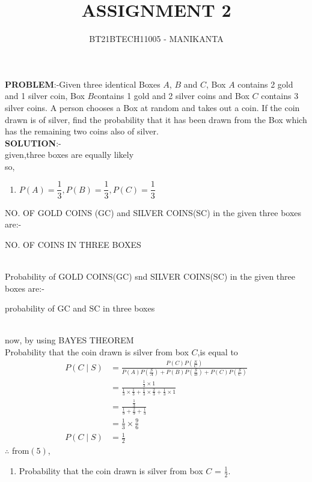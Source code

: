 \documentclass[journal,12pt,twocolumn]{IEEEtran}
\begin{document}
\vspace{3cm}
\title{ASSIGNMENT 2}
\author{BT21BTECH11005 - MANIKANTA}

\maketitle
\textbf{PROBLEM}:-Given three identical Boxes $A$, $B$ and $C$, Box $A$ contains 2 gold and 1 silver coin, Box $B $contains 1 gold and 2 silver coins and Box $C$ contains 3 silver coins. A person chooses a Box at random and takes out a coin. If the coin drawn is of silver, find the probability that it has been drawn from the Box which has the remaining two coins also of silver.\\

\textbf{SOLUTION}:-\\
given,three boxes are equally likely\\
so,\\
\begin{enumerate}[label=]
\item $\displaystyle P(A)= \dfrac{1}{3},\displaystyle P(B)= \dfrac{1}{3},\displaystyle P(C)= \dfrac{1}{3}$
\end{enumerate}

NO. OF GOLD COINS (GC) and SILVER COINS(SC) in the given three boxes are:-
\begin{table}[ht!]
 
\caption{NO. OF COINS IN THREE BOXES}
\label{Tables : TABLE}
\end{table}\\

Probability of GOLD COINS(GC) snd SILVER COINS(SC) in the given three boxes are:-
 \begin{table}[ht!]
 
\caption{probability of GC and SC in three boxes}
\label{Tables : TABLE}
\end{table}\\

now,
by using BAYES THEOREM\\
Probability that the coin drawn is silver from box $C$,is equal to
\begin{align}
P(C \mid S) &= \frac{P(C)P(\frac{S}{C})}{P(A)P(\frac{S}{A})+P(B)P(\frac{S}{B})+P(C)P(\frac{S}{C})}\\
 &= \frac{\frac{1}{3} \times 1}{\frac{1}{3} \times \frac{1}{3}+\frac{1}{3} \times \frac{2}{3}+\frac{1}{3} \times 1
 }\\
 &= \frac{\frac{1}{3}}{\frac{1}{9}+\frac{2}{9}+\frac{1}{3}}\\
 &= \frac{1}{3} \times \frac{9}{6}\\
 P(C \mid S) &= \frac{1}{2}
\end{align}
$\therefore$ from$(5)$,\\
\begin{enumerate}[label=]
\item Probability that the coin drawn is silver from box $C$ = $\frac{1}{2}$.
\end{enumerate}
\end{document}
